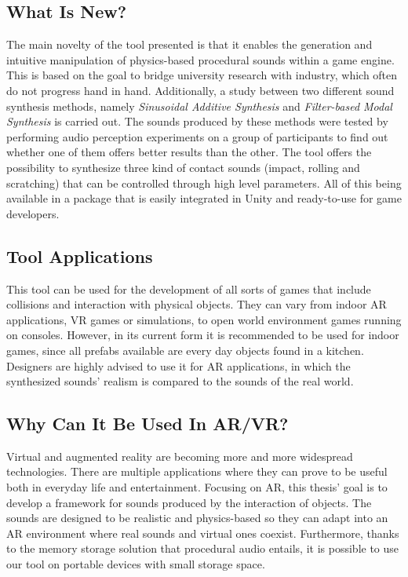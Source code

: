 \subsection{What Is New?}
The main novelty of the tool presented is that it enables the generation and intuitive manipulation of physics-based procedural sounds within a game engine. This is based on the goal to bridge university research with industry, which often do not progress hand in hand.
Additionally, a study between two different sound synthesis methods, namely \textit{Sinusoidal Additive Synthesis} and \textit{Filter-based Modal Synthesis} is carried out. The sounds produced by these methods were tested by performing audio perception experiments on a group of participants to find out whether one of them offers better results than the other.
The tool offers the possibility to synthesize three kind of contact sounds (impact, rolling and scratching) that can be controlled through high level parameters. All of this being available in a package that is easily integrated in Unity\textsuperscript{\textregistered} and ready-to-use for game developers. 

\subsection{Tool Applications}
This tool can be used for the development of all sorts of games that include collisions and interaction with physical objects. They can vary from indoor \gls{AR} applications, \gls{VR} games or simulations, to open world environment games running on consoles. However, in its current form it is recommended to be used for indoor games, since all prefabs available are every day objects found in a kitchen. Designers are highly advised to use it for \gls{AR} applications, in which the synthesized sounds' realism is compared to the sounds of the real world.

\subsection{Why Can It Be Used In AR/VR?}
Virtual and augmented reality are becoming more and more widespread technologies. There are multiple applications where they can prove to be useful both in everyday life and entertainment. Focusing on \gls{AR}, this thesis' goal is to develop a framework for sounds produced by the interaction of objects. The sounds are designed to be realistic and physics-based so they can adapt into an \gls{AR} environment where real sounds and virtual ones coexist. Furthermore, thanks to the memory storage solution that procedural audio entails, it is possible to use our tool on portable devices with small storage space.

